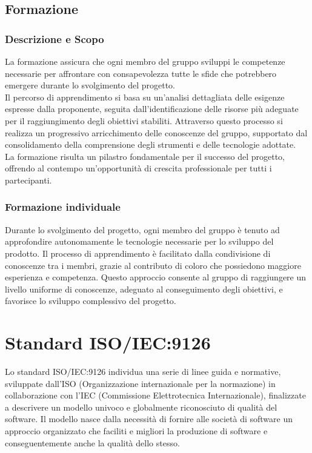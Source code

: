 \documentclass[10pt]{article}
\begin{document}
\begin{justify}
    \subsection{Formazione}
    \label{formazione}
    \subsubsection{Descrizione e Scopo}
    La formazione assicura che ogni membro del gruppo sviluppi le competenze necessarie per affrontare con consapevolezza tutte le sfide che potrebbero emergere durante lo svolgimento del progetto.\\
    Il percorso di apprendimento si basa su un'analisi dettagliata delle esigenze espresse dalla proponente, seguita dall’identificazione delle risorse più adeguate per il raggiungimento degli obiettivi stabiliti.
    Attraverso questo processo si realizza un progressivo arricchimento delle conoscenze del gruppo, supportato dal consolidamento della comprensione degli strumenti e delle tecnologie adottate.\\
    La formazione risulta un pilastro fondamentale per il successo del progetto, offrendo al contempo un'opportunità di crescita professionale per tutti i partecipanti.

    \subsubsection{Formazione individuale}
    Durante lo svolgimento del progetto, ogni membro del gruppo è tenuto ad approfondire autonomamente le tecnologie necessarie per lo sviluppo del prodotto. Il processo di apprendimento è facilitato dalla condivisione di conoscenze tra i membri, grazie al contributo di coloro che possiedono maggiore esperienza e competenza.
    Questo approccio consente al gruppo di raggiungere un livello uniforme di conoscenze, adeguato al conseguimento degli obiettivi, e favorisce lo sviluppo complessivo del progetto.

\newpage
\section{Standard ISO/IEC:9126}
\label{standard_qualità}
Lo standard ISO/IEC:9126 individua una serie di linee guida e normative, sviluppate dall'ISO (Organizzazione 
internazionale per la normazione) in collaborazione con l'IEC (Commissione Elettrotecnica Internazionale), finalizzate 
a descrivere un modello univoco e globalmente riconosciuto di qualità del software. Il modello nasce dalla necessità di
fornire alle società di software un approccio organizzato che faciliti e migliori la produzione di software e conseguentemente 
anche la qualità dello stesso.


\end{justify}
\end{document}
